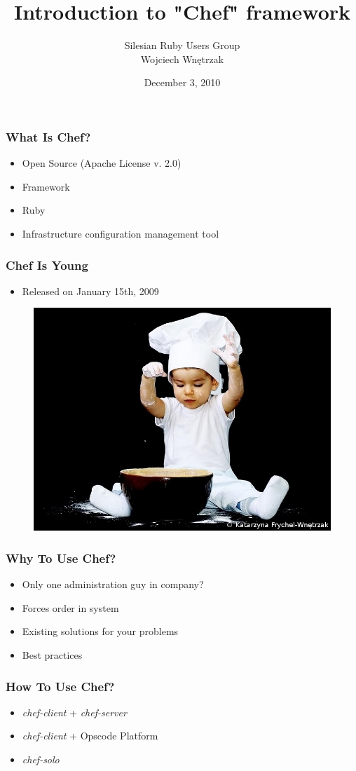 \documentclass[16pt]{beamer}
\author{Silesian Ruby Users Group\\
  \footnotesize{Wojciech Wnętrzak}}
\date{December 3, 2010}
\title{Introduction to "Chef" framework}
\begin{document}
\frame{\titlepage}

\begin{frame}
  \frametitle{What Is Chef?}
  \begin{itemize}
    \item Open Source (Apache License v. 2.0)
    \item Framework
    \item Ruby
    \item Infrastructure configuration management tool
  \end{itemize}
\end{frame}

\begin{frame}
  \frametitle{Chef Is Young}
  \begin{itemize}
    \item Released on January 15th, 2009
  \end{itemize}
  \begin{figure}
    \includegraphics[width=0.8\linewidth]{images/young-chef}
  \end{figure}
\end{frame}

\begin{frame}
  \frametitle{Why To Use Chef?}
  \begin{itemize}
    \item Only one administration guy in company?
    \item Forces order in system
    \item Existing solutions for your problems
    \item Best practices
  \end{itemize}
\end{frame}

\begin{frame}
  \frametitle{How To Use Chef?}
  \begin{itemize}
    \item \emph{chef-client} + \emph{chef-server}
    \item \emph{chef-client} + Opscode Platform
    \item \emph{chef-solo}
  \end{itemize}
\end{frame}
\end{document}
